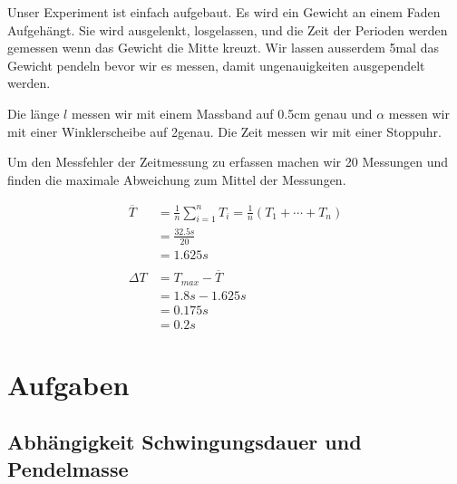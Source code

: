 \documentclass[12pt, a4paper, twoside]{article}
\begin{document}
Unser Experiment ist einfach aufgebaut. 
Es wird ein Gewicht an einem Faden Aufgehängt. 
Sie wird ausgelenkt, losgelassen, und die Zeit der Perioden werden gemessen wenn das Gewicht die Mitte kreuzt. 
Wir lassen ausserdem 5mal das Gewicht pendeln bevor wir es messen, damit ungenauigkeiten ausgependelt werden.

Die länge $l$ messen wir mit einem Massband auf 0.5cm genau und $\alpha$ messen wir mit einer Winklerscheibe auf 2\textdegree genau. Die Zeit messen wir mit einer Stoppuhr.

Um den Messfehler der Zeitmessung zu erfassen machen wir 20 Messungen und finden die maximale Abweichung zum Mittel der Messungen.

\begin{align*}
  \overline{T} & = \frac{1}{n} \sum_{i=1}^{n} T_{i}=\frac{1}{n}\left(T_{1}+\cdots+T_{n}\right) \\
               & =\frac{32.5s}{20}                                                             \\
               & =1.625s                                                                       \\
  \\
  \Delta T     & = T_{max} - \overline{T}                                                      \\
               & = 1.8s - 1.625s                                                               \\
               & = 0.175s                                                                      \\
               & = 0.2s
\end{align*}

\vfill\pagebreak

\section{Aufgaben}
\subsection{Abhängigkeit Schwingungsdauer und Pendelmasse}

\end{document}
